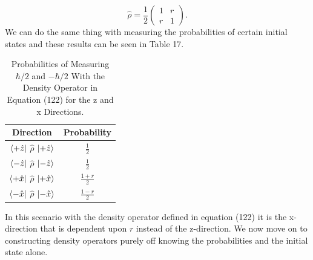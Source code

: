 \documentclass[twocolumn]{article}
\begin{document}
\begin{equation}
\hat{\rho}=\frac{1}{2}
\begin{pmatrix}
1 & r \\
r & 1
\end{pmatrix}.
\end{equation}
We can do the same thing with measuring the probabilities of certain initial states and these results can be seen in Table 17. 
\begin{table}[h!]
\begin{center}
\begin{tabular}{ |c|c| }
\hline Direction & Probability \\
\hline $\bra{+\hat{z}}$ $\hat{\rho}$ $\ket{+\hat{z}}$ & $\frac{1}{2}$ \\
\hline $\bra{-\hat{z}}$ $\hat{\rho}$ $\ket{-\hat{z}}$ & $\frac{1}{2}$ \\
\hline $\bra{+\hat{x}}$ $\hat{\rho}$ $\ket{+\hat{x}}$ & $\frac{1+r}{2}$ \\
\hline $\bra{-\hat{x}}$ $\hat{\rho}$ $\ket{-\hat{x}}$ & $\frac{1-r}{2}$ \\
\hline
\end{tabular}
\caption{Probabilities of Measuring $\hbar/2$ and $-\hbar/2$ With the Density Operator in Equation (122) for the z and x Directions.}
\end{center}
\end{table} \newpage
In this scenario with the density operator defined in equation (122) it is the x-direction that is dependent upon $r$ instead of the z-direction. We now move on to constructing density operators purely off knowing the probabilities and the initial state alone.
\end{document}
